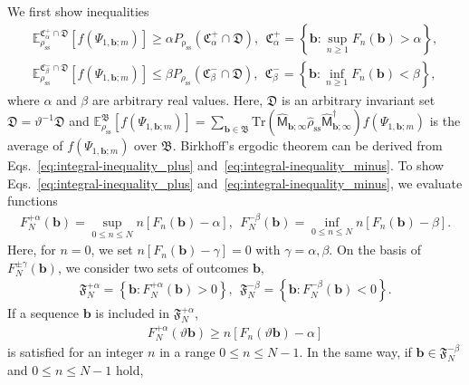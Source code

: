 \documentclass[preprint,pteplogo]{ptephy_v2}%
\numberwithin{equation}{section}
\theoremstyle{definition}
\begin{document}
We first show inequalities
\begin{align}
\mathbb{E}_{\rho_\mathrm{ss}}^{\mathfrak{C}_\alpha^+ \cap \mathfrak{D}}\left[f(\Psi_{1,\bm{b};m})\right]
\geq\alpha P_\mathrm{\rho_\mathrm{ss}}(\mathfrak{C}_\alpha^+ \cap \mathfrak{D}),\ \ \mathfrak{C}_\alpha^+=\left\{\bm{b} :
 \sup_{n\geq1}F_n(\bm{b})>\alpha\right\},
\label{eq:integral-inequality_plus}\\
\mathbb{E}_{\rho_\mathrm{ss}}^{\mathfrak{C}_\beta^- \cap \mathfrak{D}}\left[f(\Psi_{1,\bm{b};m})\right]
\leq\beta P_{\rho_\mathrm{ss}}(\mathfrak{C}_\beta^- \cap \mathfrak{D}),\ \ \mathfrak{C}_\beta^-=\left\{\bm{b} :
 \inf_{n\geq1}F_n(\bm{b})<\beta\right\},
\label{eq:integral-inequality_minus}
\end{align}
where $\alpha$ and $\beta$ are arbitrary real values. 
Here, $\mathfrak{D}$ is an arbitrary invariant set $\mathfrak{D}=\vartheta^{-1}\mathfrak{D}$ and $\mathbb{E}_{\rho_\mathrm{ss}}^\mathfrak{B}\left[f(\Psi_{1,\bm{b};m})\right]=\sum_{\bm{b} \in \mathfrak{B}}\mathrm{Tr}\left(\hat{\mathsf{M}}_{\bm{b};\infty}\hat{\rho}_\mathrm{ss}\hat{\mathsf{M}}_{\bm{b};\infty}^\dagger\right)f(\Psi_{1,\bm{b};m})$ is the average of $f(\Psi_{1,\bm{b};m})$ over $\mathfrak{B}$. 
Birkhoff's ergodic theorem can be derived from Eqs.~\eqref{eq:integral-inequality_plus} and~\eqref{eq:integral-inequality_minus}. 
To show Eqs.~\eqref{eq:integral-inequality_plus} and~\eqref{eq:integral-inequality_minus}, we evaluate functions
\begin{align}
F_N^{+\alpha}(\bm{b})=\sup_{0 \leq n \leq N}n\left[F_n(\bm{b})-\alpha\right],\ \ 
F_N^{-\beta}(\bm{b})=\inf_{0 \leq n \leq N}n\left[F_n(\bm{b})-\beta\right].
\label{eq:max-min_F}
\end{align}
Here, for $n=0$, we set $n\left[F_n(\bm{b})-\gamma\right]=0$ with $\gamma=\alpha,\beta$. 
On the basis of $F_N^{\pm\gamma}(\bm{b})$, we consider two sets of outcomes $\bm{b}$,
\begin{align}
\mathfrak{F}_N^{+\alpha}=\left\{\bm{b} : F_N^{+\alpha}(\bm{b})>0\right\},\ \ 
\mathfrak{F}_N^{-\beta}=\left\{\bm{b} : F_N^{-\beta}(\bm{b})<0\right\}.
\label{eq:F-N_plus-minus}
\end{align}
If a sequence $\bm{b}$ is included in $\mathfrak{F}_N^{+\alpha}$, \begin{align}
    F_N^{+\alpha}(\vartheta\bm{b}) \geq n\left[F_n(\vartheta\bm{b})-\alpha\right]
    \label{eq:inequality_F_+}
\end{align}
is satisfied for an integer $n$ in a range $0 \leq n \leq N-1$. 
In the same way, if $\bm{b}\in\mathfrak{F}_N^{-\beta}$ and $0 \leq n \leq N-1$ hold,
\end{document}
